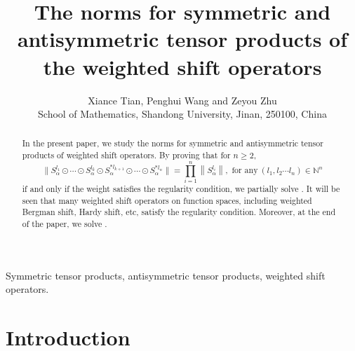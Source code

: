 \documentclass[11pt]{article}
\theoremstyle{plain}
\theoremstyle{definition}
\def\no{\noindent}
\def\bs{\bigskip}
\begin{document}
\title{{\bf {The norms for symmetric and antisymmetric tensor products of the weighted shift operators }}
}
\author{{\normalsize Xiance Tian,    Penghui Wang  and   Zeyou Zhu } \\
{ School of Mathematics, Shandong University,} {\normalsize Jinan, 250100, China} }

\date{}
\maketitle

\begin{abstract}
In the present paper,  we study the norms for symmetric and antisymmetric tensor products of weighted shift operators. By proving  that for $n\geq 2$,
	$$\|S_{\alpha}^{l_1}\odot\cdots \odot S_{\alpha}^{l_k}\odot S_{\alpha}^{*l_{k+1}}\odot\cdots \odot S_{\alpha}^{*l_{n}}\|  =\mathop{\prod}_{i=1}^n\left \| S_{\alpha}^{{l_{i}}}\right\|,  \text{ for any} \ (l_1,l_2\cdots l_n)\in\mathbb N^n$$ if and only if the weight satisfies the regularity condition, we partially solve  \cite[Problem 6 and Problem 7]{GA}.
It will be seen that many weighted shift operators on function spaces, including weighted Bergman shift, Hardy shift, etc, satisfy the regularity condition. Moreover, at the end of the paper, we solve \cite[Problem 1 and Problem 2]{GA}. 
\end{abstract}

\bs


\bs

\no{\bf Key Words:} Symmetric tensor products,  antisymmetric tensor products,  weighted shift operators.

\newtheorem{theorem}{Theorem}[section]
\newtheorem{lemma}[theorem]{Lemma}
\newtheorem{proposition}[theorem]{Proposition}
\newtheorem{corollary}[theorem]{Corollary}






\section{Introduction}
\indent\indent
\end{document}
